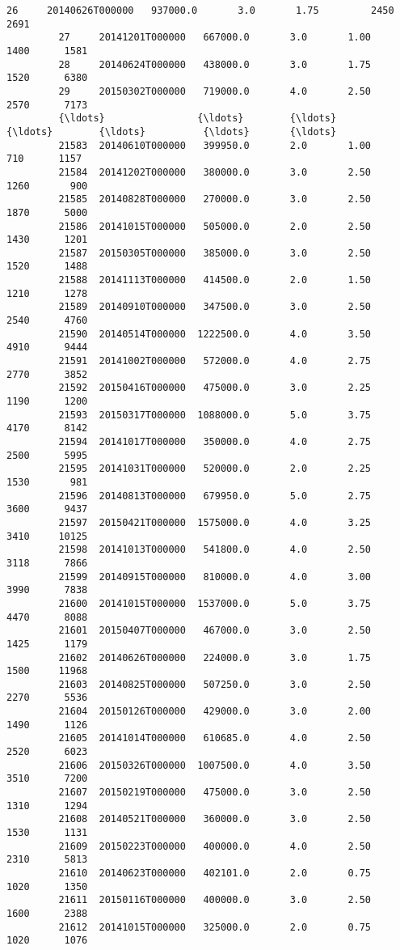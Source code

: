 \documentclass[11pt]{article}
\begin{document}
\begin{Verbatim}[commandchars=\\\{\}]
         26     20140626T000000   937000.0       3.0       1.75         2450      2691   
         27     20141201T000000   667000.0       3.0       1.00         1400      1581   
         28     20140624T000000   438000.0       3.0       1.75         1520      6380   
         29     20150302T000000   719000.0       4.0       2.50         2570      7173   
         {\ldots}                {\ldots}        {\ldots}       {\ldots}        {\ldots}          {\ldots}       {\ldots}   
         21583  20140610T000000   399950.0       2.0       1.00          710      1157   
         21584  20141202T000000   380000.0       3.0       2.50         1260       900   
         21585  20140828T000000   270000.0       3.0       2.50         1870      5000   
         21586  20141015T000000   505000.0       2.0       2.50         1430      1201   
         21587  20150305T000000   385000.0       3.0       2.50         1520      1488   
         21588  20141113T000000   414500.0       2.0       1.50         1210      1278   
         21589  20140910T000000   347500.0       3.0       2.50         2540      4760   
         21590  20140514T000000  1222500.0       4.0       3.50         4910      9444   
         21591  20141002T000000   572000.0       4.0       2.75         2770      3852   
         21592  20150416T000000   475000.0       3.0       2.25         1190      1200   
         21593  20150317T000000  1088000.0       5.0       3.75         4170      8142   
         21594  20141017T000000   350000.0       4.0       2.75         2500      5995   
         21595  20141031T000000   520000.0       2.0       2.25         1530       981   
         21596  20140813T000000   679950.0       5.0       2.75         3600      9437   
         21597  20150421T000000  1575000.0       4.0       3.25         3410     10125   
         21598  20141013T000000   541800.0       4.0       2.50         3118      7866   
         21599  20140915T000000   810000.0       4.0       3.00         3990      7838   
         21600  20141015T000000  1537000.0       5.0       3.75         4470      8088   
         21601  20150407T000000   467000.0       3.0       2.50         1425      1179   
         21602  20140626T000000   224000.0       3.0       1.75         1500     11968   
         21603  20140825T000000   507250.0       3.0       2.50         2270      5536   
         21604  20150126T000000   429000.0       3.0       2.00         1490      1126   
         21605  20141014T000000   610685.0       4.0       2.50         2520      6023   
         21606  20150326T000000  1007500.0       4.0       3.50         3510      7200   
         21607  20150219T000000   475000.0       3.0       2.50         1310      1294   
         21608  20140521T000000   360000.0       3.0       2.50         1530      1131   
         21609  20150223T000000   400000.0       4.0       2.50         2310      5813   
         21610  20140623T000000   402101.0       2.0       0.75         1020      1350   
         21611  20150116T000000   400000.0       3.0       2.50         1600      2388   
         21612  20141015T000000   325000.0       2.0       0.75         1020      1076   
         

\end{Verbatim}
\end{document}

